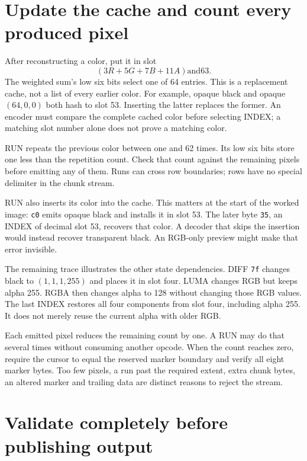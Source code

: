 \section{Update the cache and count every produced pixel}

After reconstructing a color, put it in slot
\[
  (3R+5G+7B+11A)\mathbin{\mathrm{and}}63.
\]
The weighted sum's low six bits select one of 64 entries. This is a replacement
cache, not a list of every earlier color. For example, opaque black and opaque
$(64,0,0)$ both hash to slot 53. Inserting the latter replaces the former.
An encoder must compare the complete cached color before selecting INDEX;
a matching slot number alone does not prove a matching color.

RUN repeats the previous color between one and 62 times. Its low six bits store
one less than the repetition count. Check that count against the remaining
pixels before emitting any of them. Runs can cross row boundaries; rows have
no special delimiter in the chunk stream.

RUN also inserts its color into the cache. This matters at the start of the
worked image: \texttt{c0} emits opaque black and installs it in slot 53. The
later byte \texttt{35}, an INDEX of decimal slot 53, recovers that color.
A decoder that skips the insertion would instead recover transparent black.
An RGB-only preview might make that error invisible.



The remaining trace illustrates the other state dependencies. DIFF \texttt{7f}
changes black to $(1,1,1,255)$ and places it in slot four. LUMA changes RGB but
keeps alpha 255. RGBA then changes alpha to 128 without changing those RGB
values. The last INDEX restores all four components from slot four, including
alpha 255. It does not merely reuse the current alpha with older RGB.

Each emitted pixel reduces the remaining count by one. A RUN may do that
several times without consuming another opcode. When the count reaches zero,
require the cursor to equal the reserved marker boundary and verify all eight
marker bytes. Too few pixels, a run past the required extent, extra chunk bytes,
an altered marker and trailing data are distinct reasons to reject the stream.

\section{Validate completely before publishing output}

